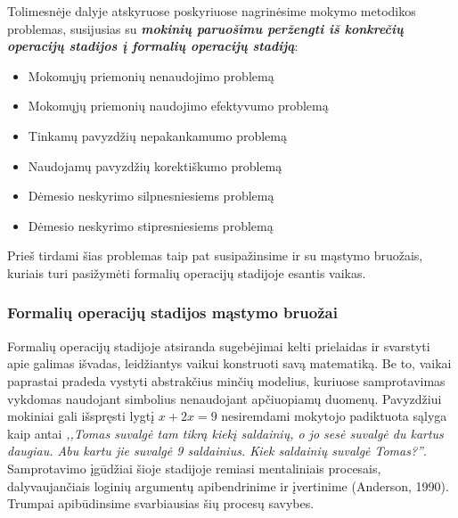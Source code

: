 \documentclass{article}
\begin{document}
Tolimesnėje dalyje atskyruose poskyriuose nagrinėsime mokymo metodikos problemas, susijusias su  \textbf{\textit{mokinių paruošimu peržengti iš konkrečių operacijų stadijos į formalių operacijų stadiją}}:

\begin{itemize}
\item Mokomųjų priemonių nenaudojimo problemą
\item Mokomųjų priemonių naudojimo efektyvumo problemą
\item Tinkamų pavyzdžių nepakankamumo problemą
\item Naudojamų pavyzdžių korektiškumo problemą
\item Dėmesio neskyrimo silpnesniesiems problemą
\item Dėmesio neskyrimo stipresniesiems problemą
\end{itemize}

Prieš tirdami šias problemas taip pat susipažinsime ir su mąstymo bruožais, kuriais turi pasižymėti formalių operacijų stadijoje esantis vaikas.

\subsubsection{Formalių operacijų stadijos mąstymo bruožai}

Formalių operacijų stadijoje atsiranda sugebėjimai kelti prielaidas ir svarstyti apie galimas išvadas, leidžiantys vaikui konstruoti savą matematiką. Be to, vaikai paprastai pradeda vystyti abstrakčius minčių modelius, kuriuose samprotavimas vykdomas naudojant simbolius nenaudojant apčiuopiamų duomenų. Pavyzdžiui mokiniai gali išspręsti lygtį $x + 2x = 9$ nesiremdami mokytojo padiktuota sąlyga kaip antai \textit{,,Tomas suvalgė tam tikrą kiekį saldainių, o jo sesė suvalgė du kartus daugiau. Abu kartu jie suvalgė 9 saldainius. Kiek saldainių suvalgė Tomas?''}. Samprotavimo įgūdžiai šioje stadijoje remiasi mentaliniais procesais, dalyvaujančiais loginių argumentų apibendrinime ir įvertinime  (Anderson, 1990). Trumpai apibūdinsime svarbiausias šių procesų savybes.
\end{document}
